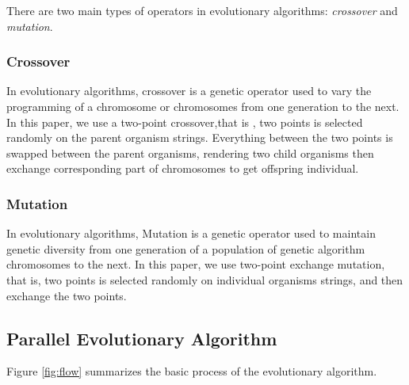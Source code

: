 There are two main types of operators in evolutionary algorithms:
\emph{crossover} and \emph{mutation}.

\subsubsection{Crossover}
In evolutionary algorithms, crossover is a genetic operator used to vary the
programming of a chromosome or chromosomes from one generation to the next.  In
this paper, we use a two-point crossover,that is , two points is selected
randomly on the parent organism strings. Everything between the two points is
swapped between the parent organisms, rendering two child organisms then
exchange corresponding part of chromosomes to get offspring individual.


\subsubsection{Mutation}
In evolutionary algorithms, Mutation is a genetic operator used to maintain
genetic diversity from one generation of a population of genetic algorithm
chromosomes to the next.  In this paper, we use two-point exchange mutation,
that is, two points is selected randomly on individual organisms strings, and
then exchange the two points.


\subsection{Parallel Evolutionary Algorithm}
%
Figure \ref{fig:flow} summarizes the basic process of the evolutionary
algorithm.


